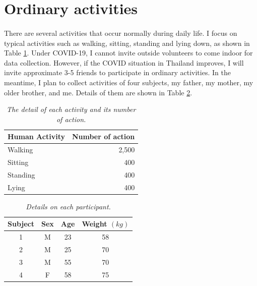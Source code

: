 \section{Ordinary activities}
\paragraph{}
There are several activities that occur normally during daily life. I focus on typical activities such as walking, sitting, standing and lying down, as shown in Table \ref{tab:number_action}. Under COVID-19, I cannot invite outside volunteers to come indoor for data collection. However, if the COVID situation in Thailand improves, I will invite approximate 3-5 friends to participate in ordinary activities. In the meantime, I plan to collect activities of four subjects, my father, my mother, my older brother, and me. Details of them are shown in Table \ref{tab:participants}.

\begin{table}[H]
\begin{center}
\caption[The detail of each activity and its number of action.]{\emph{The detail of each activity and its number of action.} \\ \hspace{\textwidth}}\label{tab:number_action}
\begin{tabular}{ l r }
  \textbf{Human Activity} & \textbf{Number of action}\\
\hline
Walking & 2,500 \\
\hline
Sitting & 400 \\
\hline
Standing & 400 \\
\hline
Lying & 400 \\
\hline
   \end{tabular}
\end{center}
 \end{table}
 
\begin{table}[H]
\begin{center}
\caption[Details on each participant.
]{\emph{Details on each participant.} 
\\ \hspace{\textwidth}}\label{tab:participants}
\begin{tabular}{c c c c}
  \textbf{Subject} & \textbf{Sex} &  \textbf{Age} & \textbf{Weight $(kg)$}  \\
\hline

1 & M & 23  & 58 \\
\hline

2 & M & 25  & 70 \\
\hline

3 & M & 55  & 70 \\
\hline

4 & F & 58  & 75 \\
\hline

   \end{tabular}
\end{center}
 \end{table}
  
